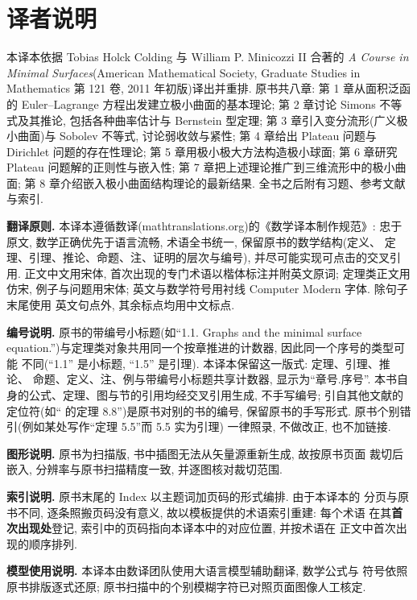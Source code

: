 \chapter*{译者说明}

本译本依据 Tobias Holck Colding 与 William P. Minicozzi II 合著的
\emph{A Course in Minimal Surfaces}(American Mathematical Society,
Graduate Studies in Mathematics 第 121 卷, 2011 年初版)译出并重排. 原书共八章:
第 1 章从面积泛函的 Euler--Lagrange 方程出发建立极小曲面的基本理论;
第 2 章讨论 Simons 不等式及其推论, 包括各种曲率估计与 Bernstein 型定理;
第 3 章引入变分流形(广义极小曲面)与 Sobolev 不等式, 讨论弱收敛与紧性;
第 4 章给出 Plateau 问题与 Dirichlet 问题的存在性理论;
第 5 章用极小极大方法构造极小球面;
第 6 章研究 Plateau 问题解的正则性与嵌入性;
第 7 章把上述理论推广到三维流形中的极小曲面;
第 8 章介绍嵌入极小曲面结构理论的最新结果. 全书之后附有习题、参考文献与索引.

\textbf{翻译原则.} 本译本遵循数译(mathtranslations.org)的《数学译本制作规范》:
忠于原文, 数学正确优先于语言流畅, 术语全书统一, 保留原书的数学结构(定义、
定理、引理、推论、命题、注、证明的层次与编号), 并尽可能实现可点击的交叉引用.
正文中文用宋体, 首次出现的专门术语以楷体标注并附英文原词; 定理类正文用仿宋,
例子与问题用宋体; 英文与数学符号用衬线 Computer Modern 字体. 除句子末尾使用
英文句点外, 其余标点均用中文标点.

\textbf{编号说明.} 原书的带编号小标题(如``1.1. Graphs and the minimal surface
equation.'')与定理类对象共用同一个按章推进的计数器, 因此同一个序号的类型可能
不同(``1.1'' 是小标题, ``1.5'' 是引理). 本译本保留这一版式: 定理、引理、推论、
命题、定义、注、例与带编号小标题共享计数器, 显示为``章号.序号''. 本书自身的公式、定理、图与节的引用均经交叉引用生成, 不手写编号;
引自其他文献的定位符(如``\cite{GiTr} 的定理 8.8'')是原书对别的书的编号,
保留原书的手写形式. 原书个别错引(例如某处写作``定理 5.5''而 5.5 实为引理)
一律照录, 不做改正, 也不加链接.

\textbf{图形说明.} 原书为扫描版, 书中插图无法从矢量源重新生成, 故按原书页面
裁切后嵌入, 分辨率与原书扫描精度一致, 并逐图核对裁切范围.

\textbf{索引说明.} 原书末尾的 Index 以主题词加页码的形式编排. 由于本译本的
分页与原书不同, 逐条照搬页码没有意义, 故以模板提供的术语索引重建: 每个术语
在其\textbf{首次出现处}登记, 索引中的页码指向本译本中的对应位置, 并按术语在
正文中首次出现的顺序排列.

\textbf{模型使用说明.} 本译本由数译团队使用大语言模型辅助翻译, 数学公式与
符号依照原书排版逐式还原; 原书扫描中的个别模糊字符已对照页面图像人工核定.

\vspace{0.8cm}
\hfill \Translator

\hfill \TranslationDate

\cleardoublepage
